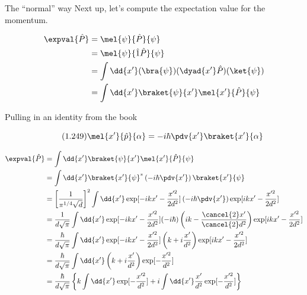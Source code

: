 \begin{answer}
\begin{answerpart}{The ``normal'' way}
    Next up, let's compute the expectation value for the momentum.
    
    \begin{equation}
      \begin{split}
        \expval{\hat{P}}
        &= \mel{\psi}{\hat{P}}{\psi}\\
        &= \mel{\psi}{\hat{1}\hat{P}}{\psi}\\
        &= \int \dd{x'} (\bra{\psi})(\dyad{x'}\hat{P})(\ket{\psi})\\
        &= \int \dd{x'} \braket{\psi}{x'}\mel{x'}{\hat{P}}{\psi}\\
      \end{split}
    \end{equation}

    Pulling in an identity from the book

    \begin{equation}
      \tag{1.249}
      \mel{x'}{\hat{p}}{\alpha} = -i \hbar \pdv{x'} \braket{x'}{\alpha}
    \end{equation}

    \begin{equation}
      \begin{split}
        \expval{\hat{P}}
        &= \int \dd{x'}
        \braket{\psi}{x'}
        \mel{x'}{\hat{P}}{\psi}\\
        &= \int \dd{x'}
        \braket{x'}{\psi}^{*}
        \left(-i \hbar \pdv{x'}\right)
        \braket{x'}{\psi}\\
        &= \left[\frac{1}{\pi^{1/4}\sqrt{d}}\right]^2
        \int \dd{x'}
        \exp[-ikx' - \frac{x'^{2}}{2d^2}]
        \left(-i \hbar \pdv{x'}\right)
        \exp[ikx' - \frac{x'^{2}}{2d^2}]\\
        &= \frac{1}{d\sqrt{\pi}}
        \int \dd{x'}
        \exp[-ikx' - \frac{x'^{2}}{2d^2}]
        (-i \hbar)
        \left(
        ik - \frac{\cancel{2}x'}{\cancel{2}d^2}
        \right)
        \exp[ikx' - \frac{x'^{2}}{2d^2}]\\
        &= \frac{\hbar}{d\sqrt{\pi}}
        \int \dd{x'}
        \exp[-ikx' - \frac{x'^{2}}{2d^2}]
        \left(
        k + i\frac{x'}{d^2}
        \right)
        \exp[ikx' - \frac{x'^{2}}{2d^2}]\\
        &= \frac{\hbar}{d\sqrt{\pi}}
        \int \dd{x'}
        \left(k + i\frac{x'}{d^2}\right)
        \exp[- \frac{x'^{2}}{d^2}]\\
        &= \frac{\hbar}{d\sqrt{\pi}}
        \left\{
        k\int \dd{x'}
        \exp[- \frac{x'^{2}}{d^2}]
        + i\int \dd{x'}
        \frac{x'}{d^2}\exp[- \frac{x'^{2}}{d^2}]
        \right\}\\
      \end{split}
    \end{equation}


\end{answerpart}
\end{answer}
